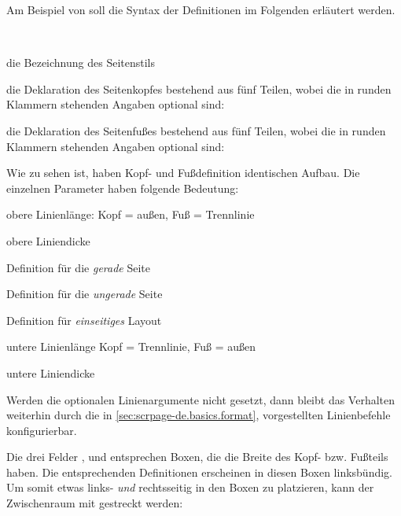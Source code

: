 Am Beispiel von  soll die Syntax der Definitionen
im Folgenden erläutert werden.
\begin{labeling}[~--]{\,}
\item[\PName{Name}] die Bezeichnung des Seitenstils
\item[\PName{Kopfdefinition}] die Deklaration des Seitenkopfes bestehend aus
  fünf Teilen, wobei die in runden Klammern stehenden Angaben optional
  sind:\hfill\\
  \hspace*{1em}%
\item[\PName{Fußdefinition}] die Deklaration des Seitenfußes bestehend aus
  fünf Teilen, wobei die in runden Klammern stehenden Angaben optional
  sind:\hfill\\
  \hspace*{1em}%
\end{labeling}

Wie zu sehen ist, haben Kopf- und Fußdefinition identischen Aufbau. Die
einzelnen Parameter haben folgende Bedeutung:
\begin{labeling}[\ --]{}
\item[\PName{OLL}] obere Linienlänge: Kopf = außen, Fuß = Trennlinie
\item[\PName{OLD}] obere Liniendicke
\item[\PName{GS}]  Definition für die \emph{gerade} Seite
\item[\PName{US}]  Definition für die \emph{ungerade} Seite
\item[\PName{ES}]  Definition für \emph{einseitiges} Layout
\item[\PName{ULL}] untere Linienlänge Kopf = Trennlinie, Fuß = außen
\item[\PName{ULD}] untere Liniendicke
\end{labeling}

Werden die optionalen Linienargumente nicht gesetzt, dann bleibt das Verhalten
weiterhin durch die in \autoref{sec:scrpage-de.basics.format},
 vorgestellten Linienbefehle
konfigurierbar.

Die drei Felder ,  und  entsprechen Boxen, die
die Breite des Kopf- bzw. Fußteils haben.
Die entsprechenden Definitionen erscheinen in diesen Boxen linksbündig.
Um somit etwas links- \emph{und} rechtsseitig in den Boxen zu platzieren,
kann der Zwischenraum mit  gestreckt werden:
%
\begin{lstcode}[belowskip=\dp\strutbox]
  {\headmark\hfill\pagemark}
\end{lstcode}

